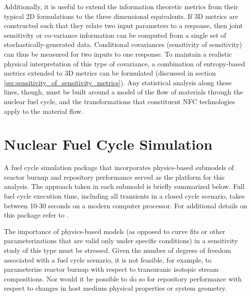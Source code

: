 \documentclass[preprint,12pt]{elsarticle}
\begin{document}
Additionally, it is useful to extend the information theoretic metrics from their typical 2D
formulations to the three dimensional equivalents.  If 3D metrics are constructed such that
they relate two input parameters to a response, then joint sensitivity or co-variance information
can be computed from a single set of stochastically-generated data.  Conditional covariances
(sensitivity of sensitivity) can thus be measured for two inputs to one response.
To maintain a realistic physical interpretation of this type of covariance, a combination of
entropy-based metrics extended to 3D metrics can be formulated  (discussed in section
\ref{sec:sensitivity_of_sensitivity_metrics}).  Any statistical analysis along these lines, though,
must be built around a model of the flow of materials through the nuclear fuel cycle, and the
transformations that constituent NFC technologies apply to the material flow.




\section{Nuclear Fuel Cycle Simulation}
\label{sec:nfcsim}

A fuel cycle simulation package that incorporates physics-based submodels of reactor burnup \cite{Scopatz2009} and
repository performance \cite{Li2009} served as the platform for this analysis. The approach taken in each
submodel is briefly summarized below. Full fuel cycle execution time, including all transients in a closed cycle
scenario, takes between 10-30 seconds on a modern computer processor. For additional details on this package 
refer to \cite{Li2009b}.

The importance of physics-based models (as opposed to curve fits or other parameterizations that are valid
only under specific conditions) in a sensitivity study of this type must be stressed. Given the number of
degrees of freedom associated with a fuel cycle scenario, it is not feasible, for example, to parameterize
reactor burnup with respect to transuranic isotopic stream compositions. Nor would it be possible to do
so for repository performance with respect to changes in host medium physical properties or system
geometry.
\end{document}
